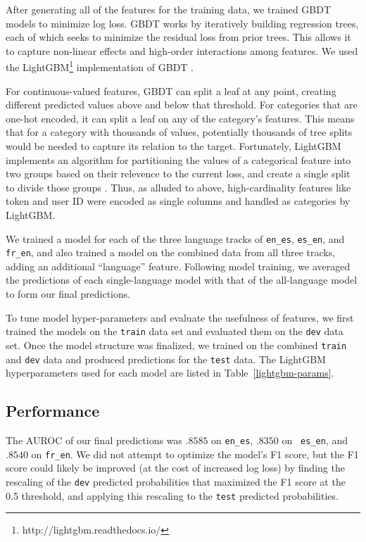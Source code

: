 \documentclass[11pt,a4paper]{article}
\begin{document}
After generating all of the features for the training data, we trained GBDT models to minimize log loss. GBDT works by
iteratively building regression trees, each of which seeks to minimize the
residual loss from prior trees. This allows it to capture non-linear effects
and high-order interactions among features. We used the LightGBM\footnote{http://lightgbm.readthedocs.io/} implementation
of GBDT \cite{ke2017lightgbm}.

For continuous-valued features, GBDT can split a leaf at any point, creating
different predicted values above and below that threshold. For categories that
are one-hot encoded, it can split a leaf on any of the category's features. This
means that for a category with thousands of values, potentially thousands of
tree splits would be needed to capture its relation to the target. Fortunately,
LightGBM implements an algorithm for partitioning the values of a categorical
feature into two groups based on their relevence to the current loss, and create
a single split to divide those groups \cite{fisher1958grouping}. Thus, as
alluded to above, high-cardinality features like token and user ID were encoded as
single columns and handled as categories by LightGBM.

We trained a model for each of the three language tracks of {\tt en\_es}, {\tt es\_en},
and {\tt fr\_en}, and also trained a model on the combined data from
all three tracks, adding an additional ``language'' feature. Following model
training, we averaged the predictions of each single-language model with that of
the all-language model to form our final predictions.

To tune model hyper-parameters and evaluate the usefulness of features, we first
trained the models on the {\tt train} data set and evaluated them on the {\tt dev}
data set. Once the model structure was finalized, we trained on the combined
{\tt train} and {\tt dev} data and produced predictions for the {\tt test} data. The
LightGBM hyperparameters used for each model are listed in Table~\ref{lightgbm-params}.



\subsection{Performance}

The AUROC of our final predictions was $.8585$ on {\tt en\_es}, $.8350$ on {\tt
  es\_en}, and $.8540$ on {\tt fr\_en}. We did not attempt to optimize the model's
F1 score, but the F1 score could likely be improved (at the cost of
increased log loss) by finding the
rescaling of the {\tt dev} predicted probabilities that maximized the F1 score at
the 0.5 threshold, and applying this rescaling to the {\tt test} predicted probabilities.
\end{document}
